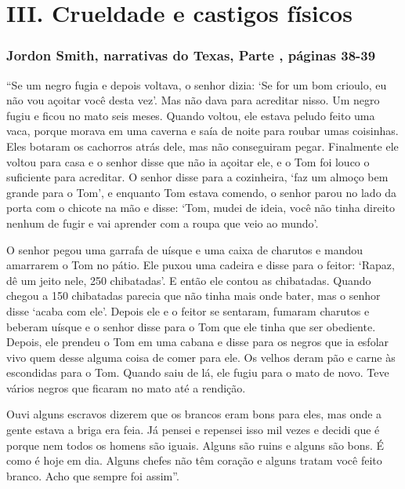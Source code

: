 \chapter{III. Crueldade e castigos físicos}

\subsection{Jordon Smith, narrativas do Texas, Parte , páginas 38-39}
\label{ref245}

``Se um negro fugia e depois voltava, o senhor dizia: `Se for um bom
crioulo, eu não vou açoitar você desta vez'. Mas não dava para acreditar
nisso. Um negro fugiu e ficou no mato seis meses. Quando voltou, ele
estava peludo feito uma vaca, porque morava em uma caverna e saía de
noite para roubar umas coisinhas. Eles botaram os cachorros atrás dele,
mas não conseguiram pegar. Finalmente ele voltou para casa e o senhor
disse que não ia açoitar ele, e o Tom foi louco o suficiente para
acreditar. O senhor disse para a cozinheira, `faz um almoço bem grande
para o Tom', e enquanto Tom estava comendo, o senhor parou no lado da
porta com o chicote na mão e disse: `Tom, mudei de ideia, você não tinha
direito nenhum de fugir e vai aprender com a roupa que veio ao mundo'.

O senhor pegou uma garrafa de uísque e uma caixa de charutos e mandou
amarrarem o Tom no pátio. Ele puxou uma cadeira e disse para o feitor:
`Rapaz, dê um jeito nele, 250 chibatadas'. E então ele contou as
chibatadas. Quando chegou a 150 chibatadas parecia que não tinha mais
onde bater, mas o senhor disse `acaba com ele'. Depois ele e o feitor se
sentaram, fumaram charutos e beberam uísque e o senhor disse para o Tom
que ele tinha que ser obediente. Depois, ele prendeu o Tom em uma cabana
e disse para os negros que ia esfolar vivo quem desse alguma coisa de
comer para ele. Os velhos deram pão e carne às escondidas para o Tom.
Quando saiu de lá, ele fugiu para o mato de novo. Teve vários negros que
ficaram no mato até a rendição.

Ouvi alguns escravos dizerem que os brancos eram bons para eles, mas
onde a gente estava a briga era feia. Já pensei e repensei isso mil
vezes e decidi que é porque nem todos os homens são iguais. Alguns são
ruins e alguns são bons. É como é hoje em dia. Alguns chefes não têm
coração e alguns tratam você feito branco. Acho que sempre foi assim''.

